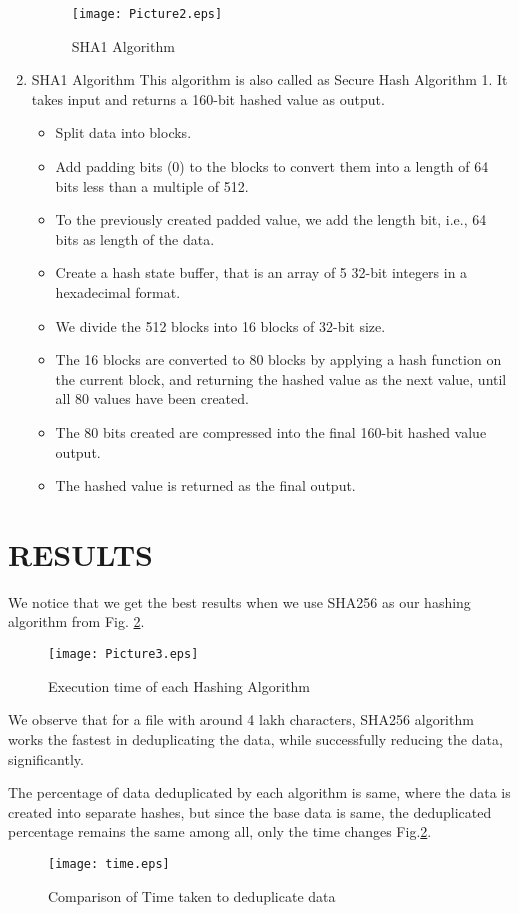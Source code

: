 \documentclass[%
 aip,
cp,  %
 amsmath,amssymb,%
 reprint,%
]{revtex4-2}
\begin{document}
\begin{enumerate}
    \begin{figure}
\texttt{[image: Picture2.eps]}%
\caption{SHA1 Algorithm }
\label{fig:sha1}
\end{figure}%
    \item{SHA1 Algorithm}
    This algorithm is also called as Secure Hash Algorithm 1. It takes input and returns a 160-bit hashed value as output. 
    \begin{itemize}
        \item{Split data into blocks.}
        \item{Add padding bits (0) to the blocks to convert them into a length of 64 bits less than a multiple of 512. }
        \item{To the previously created padded value, we add the length bit, i.e., 64 bits as length of the data.}
        \item{Create a hash state buffer, that is an array of 5 32-bit integers in a hexadecimal format. }
        \item{We divide the 512 blocks into 16 blocks of 32-bit size.}
        \item{The 16 blocks are converted to 80 blocks by applying a hash function on the current block, and returning the hashed value as the next value, until all 80 values have been created.}
        \item{The 80 bits created are compressed into the final 160-bit hashed value output.}
        \item{The hashed value is returned as the final output.}
    \end{itemize}
\end{enumerate}%

\section{\label{sec:results}RESULTS}
We notice that we get the best results when we use SHA256 as our hashing algorithm from Fig. \ref{fig:execTime}.
\begin{figure}
\texttt{[image: Picture3.eps]}%
\caption{Execution time of each Hashing Algorithm}
\label{fig:execTime}
\end{figure}%
We observe that for a file with around 4 lakh characters, SHA256 algorithm works the fastest in deduplicating the data, while successfully reducing the data, significantly. %

The percentage of data deduplicated  by each algorithm is same, where the data is created into separate hashes, but since the base data is same, the deduplicated percentage remains the same among all, only the time changes Fig.\ref{fig:execTime}.
\begin{figure}
    \centering
    \texttt{[image: time.eps]}
    \caption{Comparison of Time taken to deduplicate data }
    \label{fig:my_label}
\end{figure}
\end{document}
